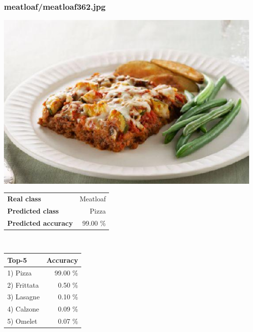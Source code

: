\subsubsection{meatloaf/meatloaf362.jpg}

\begin{minipage}[t]{0.4\textwidth}
	\vspace{0pt}
	\includegraphics[width=\linewidth]{images/evaluation-images/meatloaf/meatloaf362.jpg}
\end{minipage}
\hfill
\begin{minipage}[t]{0.5\textwidth}
	\vspace{0pt}\raggedright
	\begin{tabularx}{\textwidth}{X r}
		\small \textbf{Real class} & \small Meatloaf\\
		\small \textbf{Predicted class} & \small Pizza\\
		\small \textbf{Predicted accuracy} & \small 99.00 \%
    \end{tabularx}\\
    
    \vspace{6pt}
	\begin{tabularx}{\textwidth}{X r}
        \small \textbf{Top-5} & \small \textbf{Accuracy} \\
        \hline
		\small 1) Pizza & \small 99.00 \%\\\small 2) Frittata & \small 0.50 \%\\\small 3) Lasagne & \small 0.10 \%\\\small 4) Calzone & \small 0.09 \%\\\small 5) Omelet & \small 0.07 \%
    \end{tabularx}
\end{minipage}
    
